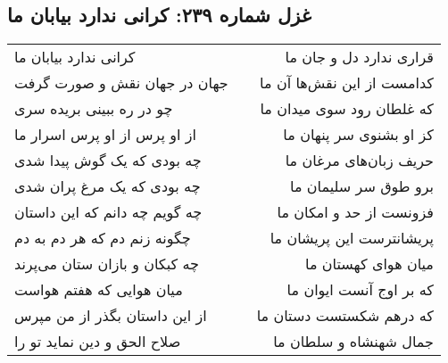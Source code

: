 \begin{center}
\section*{غزل شماره ۲۳۹: کرانی ندارد بیابان ما}
\label{sec:0239}
\begin{longtable}{l p{0.5cm} r}
کرانی ندارد بیابان ما
&&
قراری ندارد دل و جان ما
\\
جهان در جهان نقش و صورت گرفت
&&
کدامست از این نقش‌ها آن ما
\\
چو در ره ببینی بریده سری
&&
که غلطان رود سوی میدان ما
\\
از او پرس از او پرس اسرار ما
&&
کز او بشنوی سر پنهان ما
\\
چه بودی که یک گوش پیدا شدی
&&
حریف زبان‌های مرغان ما
\\
چه بودی که یک مرغ پران شدی
&&
برو طوق سر سلیمان ما
\\
چه گویم چه دانم که این داستان
&&
فزونست از حد و امکان ما
\\
چگونه زنم دم که هر دم به دم
&&
پریشانترست این پریشان ما
\\
چه کبکان و بازان ستان می‌پرند
&&
میان هوای کهستان ما
\\
میان هوایی که هفتم هواست
&&
که بر اوج آنست ایوان ما
\\
از این داستان بگذر از من مپرس
&&
که درهم شکستست دستان ما
\\
صلاح الحق و دین نماید تو را
&&
جمال شهنشاه و سلطان ما
\\
\end{longtable}
\end{center}
